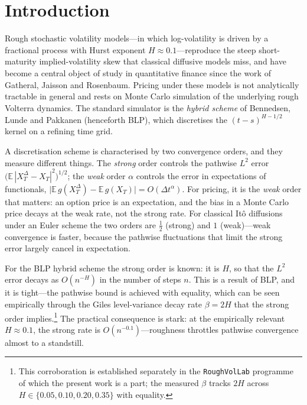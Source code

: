 \documentclass[11pt]{article}
\theoremstyle{plain}
\theoremstyle{definition}
\begin{document}
\section{Introduction}\label{sec:intro}

Rough stochastic volatility models---in which log-volatility is driven by a
fractional process with Hurst exponent $H\approx 0.1$---reproduce the steep
short-maturity implied-volatility skew that classical diffusive models miss, and
have become a central object of study in quantitative finance since the work of
Gatheral, Jaisson and Rosenbaum. Pricing under these models is not analytically
tractable in general and rests on Monte Carlo simulation of the underlying rough
Volterra dynamics. The standard simulator is the \emph{hybrid scheme} of
Bennedsen, Lunde and Pakkanen (henceforth BLP), which discretises the
$(t-s)^{H-1/2}$ kernel on a refining time grid.

A discretisation scheme is characterised by two convergence orders, and they
measure different things. The \emph{strong} order controls the pathwise
$L^2$ error $\big(\mathbb{E}\,|X_T^\Delta - X_T|^2\big)^{1/2}$; the \emph{weak}
order $\alpha$ controls the error in expectations of functionals,
$\big|\mathbb{E}\,g(X_T^\Delta) - \mathbb{E}\,g(X_T)\big| = O(\Delta t^{\alpha})$.
For pricing, it is the \emph{weak} order that matters: an option price is an
expectation, and the bias in a Monte Carlo price decays at the weak rate, not the
strong rate. For classical It\^o diffusions under an Euler scheme the two orders are
$\tfrac12$ (strong) and $1$ (weak)---weak convergence is faster, because the
pathwise fluctuations that limit the strong error largely cancel in expectation.

For the BLP hybrid scheme the strong order is known: it is $H$, so that the
$L^2$ error decays as $O(n^{-H})$ in the number of steps $n$. This is a result of
BLP, and it is tight---the pathwise bound is achieved with equality, which can be
seen empirically through the Giles level-variance decay rate $\beta = 2H$ that the
strong order implies.\footnote{This corroboration is established separately in the
\texttt{RoughVolLab} programme of which the present work is a part; the measured
$\beta$ tracks $2H$ across $H\in\{0.05,0.10,0.20,0.35\}$ with equality.} The
practical consequence is stark: at the empirically relevant $H\approx 0.1$, the
strong rate is $O(n^{-0.1})$---roughness throttles pathwise convergence almost to a
standstill.
\end{document}

